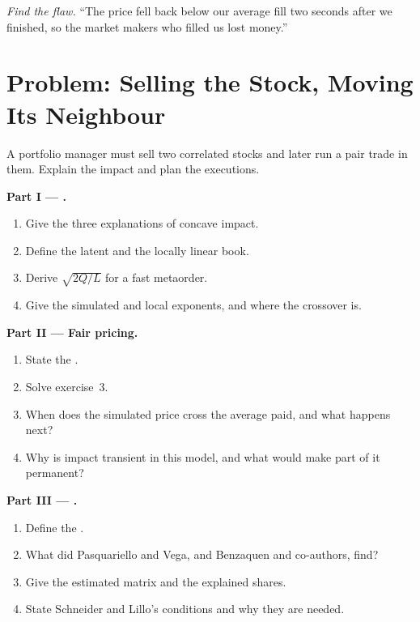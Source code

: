 \begin{exercise}[$\star\star\star$]\label{exo:mx:metaorders-latent-liquidity-and-cross-impact:8}
\emph{Find the flaw.} ``The price fell back below our average fill two seconds after we finished, so the market makers who filled us lost money.''
\end{exercise}

\section{Problem: Selling the Stock, Moving Its Neighbour}

\begin{problem}\label{pb:mx:metaorders-latent-liquidity-and-cross-impact:1}
A portfolio manager must sell two correlated stocks and later run a pair trade in them. Explain the impact and plan the executions.

\medskip\noindent\textbf{Part I --- .}
\begin{enumerate}
\item Give the three explanations of concave impact.
\item Define the latent and the locally linear book.
\item Derive $\sqrt{2Q/L}$ for a fast metaorder.
\item Give the simulated  and local exponents, and where the crossover is.
\end{enumerate}

\medskip\noindent\textbf{Part II --- Fair pricing.}
\begin{enumerate}[resume]
\item State the .
\item Solve exercise~3.
\item When does the simulated price cross the average paid, and what happens next?
\item Why is impact transient in this model, and what would make part of it permanent?
\end{enumerate}

\medskip\noindent\textbf{Part III --- .}
\begin{enumerate}[resume]
\item Define the .
\item What did Pasquariello and Vega, and Benzaquen and co-authors, find?
\item Give the estimated matrix and the explained shares.
\item State Schneider and Lillo's conditions and why they are needed.
\end{enumerate}


\end{problem}

